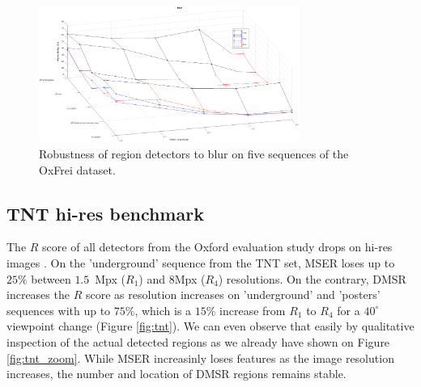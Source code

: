 \documentclass[conference,compsoc]{IEEEtran}
\begin{document}
\begin{figure}[htb]

\begin{minipage}[b]{.9\linewidth}
  \centering
  \centerline{\includegraphics[width=8.5cm]{blur_some_combined}}
\end{minipage}
\hfill
\caption{Robustness of region detectors to blur on five sequences of the OxFrei dataset.}
\label{fig:blur}
%
\end{figure}
\subsection{TNT hi-res benchmark}
\label{ssec:tnt}

The $R$ score of all detectors from the Oxford evaluation study drops on hi-res images \cite{CorRos2013}. On the 'underground' sequence from the TNT set, MSER loses up to $25\%$ between $1.5$~Mpx ($R_1$) and $8$Mpx ($R_4$) resolutions. On the contrary, DMSR increases the $R$ score as resolution increases on 'underground' and 'posters' sequences with up to $75\%$, which is a $15\%$ increase from $R_1$ to $R_4$ for a $40^{\circ}$ viewpoint change (Figure \ref{fig:tnt}). We can even observe that easily by qualitative inspection of the actual detected regions as we already have shown on Figure \ref{fig:tnt_zoom}. While MSER increasinly loses features as the image resolution increases, the number and location of DMSR regions remains stable.
\end{document}
